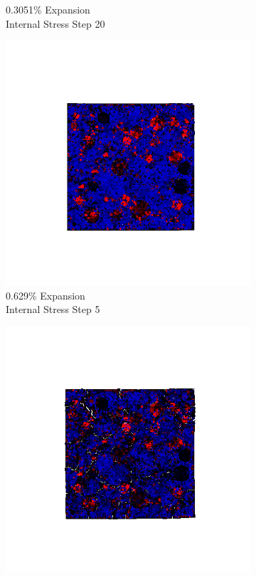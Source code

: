 \begin{figure}[ht!]
\begin{subfigure}{.25\textwidth}
      \caption{0.3051\% Expansion\\Internal Stress Step 20}
    \end{subfigure}

    \begin{subfigure}{.25\textwidth}
      \centering
      \includegraphics[width=1.0\linewidth]{Files/exp_3D/ASR/A15P75_4_s5.png}
      \caption{0.629\% Expansion\\Internal Stress Step 5}
    \end{subfigure}%
    \begin{subfigure}{.25\textwidth}
      \centering
      \includegraphics[width=1.0\linewidth]{Files/exp_3D/ASR/A15P75_4_s10.png}

\end{subfigure}
\end{figure}
